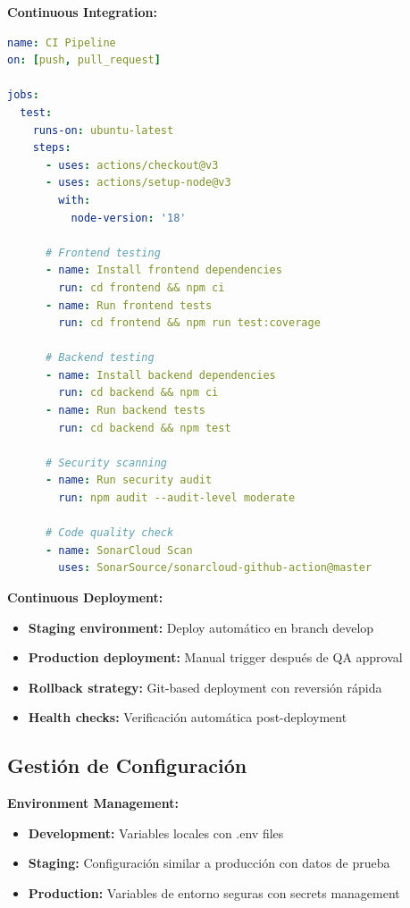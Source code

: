 \documentclass[12pt,a4paper]{report}
\begin{document}
\textbf{Continuous Integration:}
\begin{lstlisting}[language=yaml, caption=GitHub Actions workflow para CI]
name: CI Pipeline
on: [push, pull_request]

jobs:
  test:
    runs-on: ubuntu-latest
    steps:
      - uses: actions/checkout@v3
      - uses: actions/setup-node@v3
        with:
          node-version: '18'
      
      # Frontend testing
      - name: Install frontend dependencies
        run: cd frontend && npm ci
      - name: Run frontend tests
        run: cd frontend && npm run test:coverage
      
      # Backend testing
      - name: Install backend dependencies
        run: cd backend && npm ci
      - name: Run backend tests
        run: cd backend && npm test
      
      # Security scanning
      - name: Run security audit
        run: npm audit --audit-level moderate
      
      # Code quality check
      - name: SonarCloud Scan
        uses: SonarSource/sonarcloud-github-action@master
\end{lstlisting}

\textbf{Continuous Deployment:}
\begin{itemize}
\item \textbf{Staging environment:} Deploy automático en branch develop
\item \textbf{Production deployment:} Manual trigger después de QA approval
\item \textbf{Rollback strategy:} Git-based deployment con reversión rápida
\item \textbf{Health checks:} Verificación automática post-deployment
\end{itemize}

\subsection{Gestión de Configuración}

\textbf{Environment Management:}
\begin{itemize}
\item \textbf{Development:} Variables locales con .env files
\item \textbf{Staging:} Configuración similar a producción con datos de prueba
\item \textbf{Production:} Variables de entorno seguras con secrets management
\end{itemize}
\end{document}

